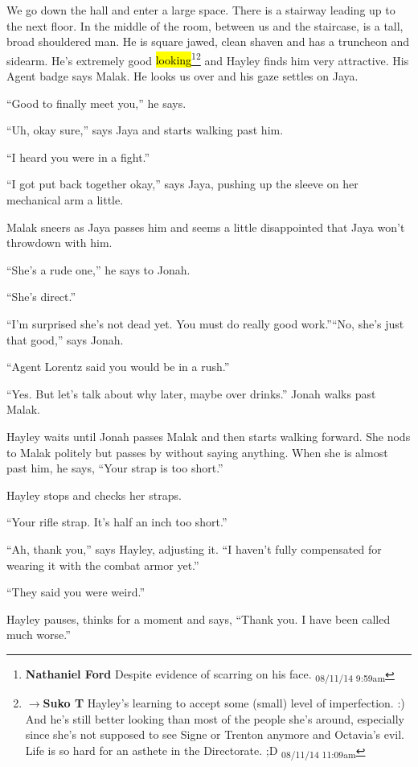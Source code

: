 We go down the hall and enter a large space. There is a stairway leading up to the next floor.  In the middle of the room, between us and the staircase, is a tall, broad shouldered man.  He is square jawed, clean shaven and has a truncheon and sidearm.  He's extremely good \hl{looking}\footnote{\textbf{Nathaniel Ford }Despite evidence of scarring on his face. \textsubscript{08/11/14 9:59am}}\footnote{$\rightarrow$\textbf{Suko T }Hayley's learning to accept some (small) level of imperfection. :)  And he's still better looking than most of the people she's around, especially since she's not supposed to see Signe or Trenton anymore and Octavia's evil.  Life is so hard for an asthete in the Directorate. ;D \textsubscript{08/11/14 11:09am}} and Hayley finds him very attractive.  His Agent badge says Malak.  He looks us over and his gaze settles on Jaya.

``Good to finally meet you,'' he says.

``Uh, okay sure,'' says Jaya and starts walking past him.

``I heard you were in a fight.''

``I got put back together okay,'' says Jaya, pushing up the sleeve on her mechanical arm a little.

Malak sneers as Jaya passes him and seems a little disappointed that Jaya won't throwdown with him.

``She's a rude one,'' he says to Jonah.

``She's direct.''

``I'm surprised she's not dead yet.  You must do really good work.''``No, she's just that good,'' says Jonah.

``Agent Lorentz said you would be in a rush.''

``Yes.  But let's talk about why later, maybe over drinks.''  Jonah walks past Malak.

Hayley waits until Jonah passes Malak and then starts walking forward.  She nods to Malak politely but passes by without saying anything.  When she is almost past him, he says, ``Your strap is too short.''

Hayley stops and checks her straps.

``Your rifle strap.  It's half an inch too short.''

``Ah, thank you,'' says Hayley, adjusting it.  ``I haven't fully compensated for wearing it with the combat armor yet.''

``They said you were weird.''

Hayley pauses, thinks for a moment and says, ``Thank you.  I have been called much worse.''

